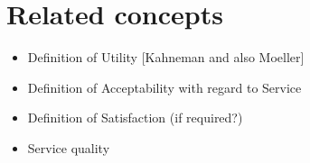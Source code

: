 \section{Related concepts}
\begin{itemize}
\item Definition of Utility [Kahneman and also Moeller]
\item Definition of Acceptability with regard to Service
\item Definition of Satisfaction (if required?)
\item Service quality
\end{itemize}
